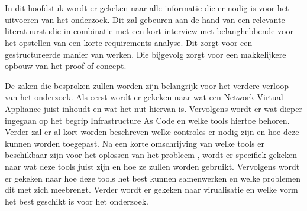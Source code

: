 \chapter{}%
\label{ch:stand-van-zaken}

In dit hoofdstuk wordt er gekeken naar alle informatie die er nodig is voor het uitvoeren van het onderzoek. Dit zal gebeuren aan de hand van een relevante literatuurstudie in combinatie met een kort interview met belanghebbende voor het opstellen van een korte requirements-analyse. Dit zorgt voor een gestructureerde manier van werken. Die bijgevolg zorgt voor een makkelijkere opbouw van het proof-of-concept. \newline

De zaken die besproken zullen worden zijn belangrijk voor het verdere verloop van het onderzoek. Als eerst wordt er gekeken naar wat een Network Virtual Appliance juist inhoudt en wat het nut hiervan is. Vervolgens wordt er wat dieper ingegaan op het begrip Infrastructure As Code en welke tools hiertoe behoren. Verder zal er al kort worden beschreven welke controles er nodig zijn en hoe deze kunnen worden toegepast. Na een korte omschrijving van welke tools er beschikbaar zijn voor het oplossen van het probleem , wordt er specifiek gekeken naar wat deze tools juist zijn en hoe ze zullen worden gebruikt. Vervolgens wordt er gekeken naar hoe deze tools het best kunnen samenwerken en welke problemen dit met zich meebrengt. Verder wordt er gekeken naar virualisatie en welke vorm het best geschikt is voor het onderzoek.




